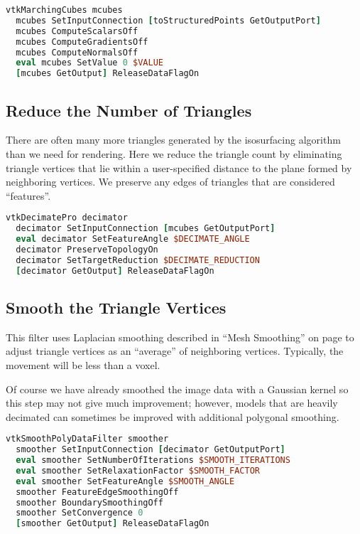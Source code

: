 \begin{lstlisting}[language=TCL, caption={Generate Triangles.}]
vtkMarchingCubes mcubes
  mcubes SetInputConnection [toStructuredPoints GetOutputPort]
  mcubes ComputeScalarsOff
  mcubes ComputeGradientsOff
  mcubes ComputeNormalsOff
  eval mcubes SetValue 0 $VALUE
  [mcubes GetOutput] ReleaseDataFlagOn
\end{lstlisting}

\subsection{Reduce the Number of Triangles}
There are often many more triangles generated by the isosurfacing algorithm than we need for rendering. Here we reduce the triangle count by eliminating triangle vertices that lie within a user-specified distance to the plane formed by neighboring vertices. We preserve any edges of triangles that are considered ``features''.

\begin{lstlisting}[language=TCL, caption={Reduce the Number of Triangles.}]
vtkDecimatePro decimator
  decimator SetInputConnection [mcubes GetOutputPort]
  eval decimator SetFeatureAngle $DECIMATE_ANGLE
  decimator PreserveTopologyOn
  decimator SetTargetReduction $DECIMATE_REDUCTION
  [decimator GetOutput] ReleaseDataFlagOn
\end{lstlisting}

\subsection{Smooth the Triangle Vertices}

This filter uses Laplacian smoothing described in ``Mesh Smoothing'' on page \pageref{subsec:mesh_smoothing} to adjust triangle vertices as an ``average'' of neighboring vertices. Typically, the movement will be less than a voxel.

Of course we have already smoothed the image data with a Gaussian kernel so this step may not give much improvement; however, models that are heavily decimated can sometimes be improved with additional polygonal smoothing.

\begin{lstlisting}[language=TCL, caption={Smooth the Triangle Vertices.}]
vtkSmoothPolyDataFilter smoother
  smoother SetInputConnection [decimator GetOutputPort]
  eval smoother SetNumberOfIterations $SMOOTH_ITERATIONS
  eval smoother SetRelaxationFactor $SMOOTH_FACTOR
  eval smoother SetFeatureAngle $SMOOTH_ANGLE
  smoother FeatureEdgeSmoothingOff
  smoother BoundarySmoothingOff
  smoother SetConvergence 0
  [smoother GetOutput] ReleaseDataFlagOn
\end{lstlisting}

